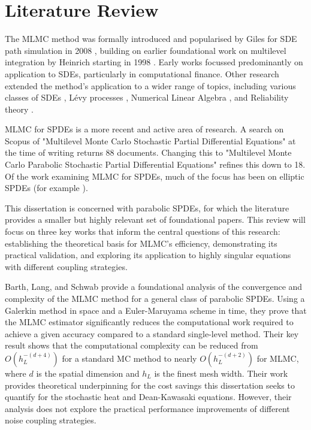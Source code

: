 \section{Literature Review}

The MLMC method was formally introduced and popularised by 
Giles for SDE path simulation in 2008 \cite{giles2008multilevel}, 
building on earlier foundational work on multilevel integration by 
Heinrich starting in 1998 \cite{heinrich1998monte}. Early works focussed 
predominantly on application to SDEs, particularly in computational 
finance. Other research extended the method's application to a wider range 
of topics, including various classes of SDEs \cite{abdulle2013stabilized,
rhee2015unbiased}, Lévy processes \cite{giles2017multilevel}, 
Numerical Linear Algebra \cite{acebron2020probabilistic},
and Reliability theory \cite{aslett2017multilevel}.

MLMC for SPDEs is a more recent and active area of research. 
A search on Scopus \cite{scopus} of "Multilevel Monte Carlo Stochastic
Partial Differential Equations" at the time of writing returns 88 documents. Changing 
this to "Multilevel Monte Carlo Parabolic Stochastic Partial Differential Equations" refines 
this down to 18. Of the work examining MLMC for SPDEs, much of the focus has been on 
elliptic SPDEs (for example \cite{abdulle2013multilevel, kornhuber2014multilevel, luo2019multilevel}).

This dissertation is concerned with parabolic SPDEs, for which the literature 
provides a smaller but highly relevant set of foundational papers. This review will focus on 
three key works that inform the central questions of this research: establishing the theoretical 
basis for MLMC's efficiency, demonstrating its practical validation, and exploring 
its application to highly singular equations with different coupling strategies. 


Barth, Lang, and Schwab \cite{barth2013multilevel} provide a foundational 
analysis of the convergence and complexity of the MLMC method for a general class of 
parabolic SPDEs. Using a Galerkin method in space and a Euler-Maruyama scheme in time, they 
prove that the  MLMC estimator significantly reduces the computational work required 
to achieve a given accuracy compared to a standard single-level method. Their 
key result shows that the computational complexity can be reduced from $O(h_L^{-(d+4)})$
for a standard MC method to nearly $O(h_L^{-(d+2)})$ for MLMC, where $d$ is the 
spatial dimension and $h_L$ is the finest mesh width. Their work provides 
theoretical underpinning for the cost savings this dissertation seeks to quantify for 
the stochastic heat and Dean-Kawasaki equations. However, their analysis does not explore
the practical performance improvements of different noise coupling strategies.

